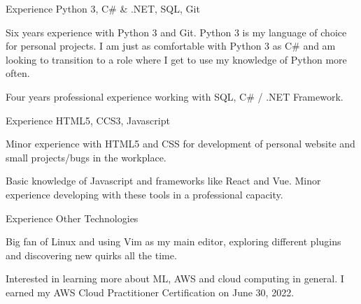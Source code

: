 \begin{cventries}
  \cventry
    {Experience}
    {Python 3, C\# \& .NET, SQL, Git}
    {}
    {}
    {
      \begin{cvitems}
		  \item Six years experience with Python 3 and Git. Python 3 is my language of choice for personal projects. I am just as comfortable with Python 3 as C\# and am looking to transition to a role where I get to use my knowledge of Python more often.
		  \item Four years professional experience working with SQL, C\# / .NET Framework.
      \end{cvitems}
    }
  \cventry
    {Experience}
    {HTML5, CCS3, Javascript}
    {}
    {}
    {
      \begin{cvitems}
	      \item Minor experience with HTML5 and CSS for development of personal website and small projects/bugs in the workplace.
		  \item Basic knowledge of Javascript and frameworks like React and Vue. Minor experience developing with these tools in a professional capacity.
      \end{cvitems}
    }
  \cventry
    {Experience}
    {Other Technologies}
    {}
    {}
    {
      \begin{cvitems}
	      \item Big fan of Linux and using Vim as my main editor, exploring different plugins and discovering new quirks all the time.
		  \item Interested in learning more about ML, AWS and cloud computing in general. I earned my AWS Cloud Practitioner Certification on June 30, 2022.
      \end{cvitems}
    }
\vspace*{-2pt}
\end{cventries}

